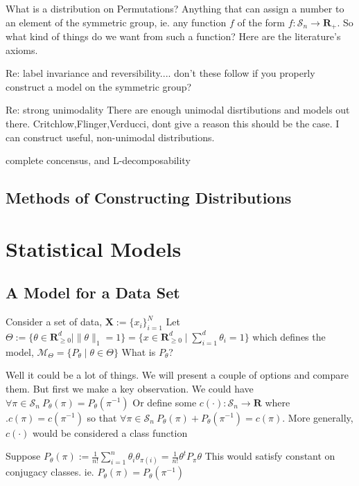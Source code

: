\documentclass{article}
\theoremstyle{definition}
\begin{document}
What is a distribution on Permutations? Anything that can assign a number to an element of the symmetric group, ie. any function $f$ of the form \(f:\mathcal{S}_n \rightarrow \mathbf{R}_+ \). So what kind of things do we want from such a function? Here are the literature's axioms. 

Re: label invariance and reversibility....
don't these follow if you properly construct a model on the symmetric group?

Re: strong unimodality
There are enough unimodal disrtibutions and models out there. Critchlow,Flinger,Verducci, dont give a reason this should be the case. I can construct useful, non-unimodal distributions.
    
complete concensus, and L-decomposability

\subsection{Methods of Constructing Distributions}

\section{Statistical Models}
\subsection{A Model for a Data Set}
Consider a set of data, \( \mathbf{X} := \{ x_i \}_{i=1}^N\)
Let \(
\Theta := \{ \theta \in \mathbf{R}_{\geq 0}^d \mid  \|\theta\|_1 = 1\} = \{x\in \mathbf{R}_{\geq 0}^d \mid \sum_{i=1}^d \theta_i = 1\} 
\) 
which defines the model, \(
\mathcal{M}_\Theta = \{ P_\theta \mid \theta \in \Theta \}
\)
What is $P_\theta$?

Well it could be a lot of things. We will present a couple of options and compare them. But first we make a key observation. 
We could have $ \forall \pi \in \mathcal{S}_n \: P_\theta(\pi) = P_\theta(\pi^{-1}) $
Or define some $c(\cdot):\mathcal{S}_n \rightarrow \mathbf{R} $ where $. c(\pi) = c(\pi^{-1}) $ so that $ \forall \pi \in \mathcal{S}_n \: P_\theta(\pi) + P_\theta(\pi^{-1})  = c( \pi ) $. More generally, $c(\cdot) $ would be considered a class function

Suppose \( P_\theta(\pi) := \frac{1}{n!}\sum_{i=1}^n \theta_i\theta_{\pi(i)} = \frac{1}{n!}\theta^t P_\pi\theta \) 
This would satisfy constant on conjugacy classes. ie. $ P_\theta(\pi) = P_\theta(\pi^{-1}) $
\end{document}

